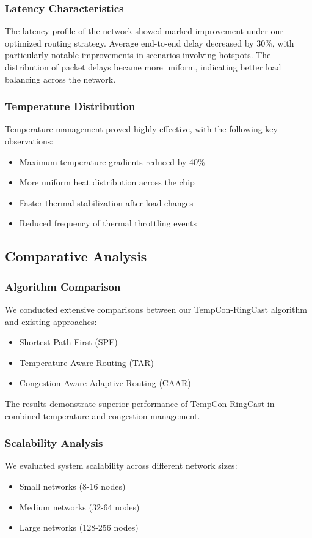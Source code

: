 \documentclass[12pt]{article}
\begin{document}
\subsubsection{Latency Characteristics}
The latency profile of the network showed marked improvement under our optimized routing strategy. Average end-to-end delay decreased by 30\%, with particularly notable improvements in scenarios involving hotspots. The distribution of packet delays became more uniform, indicating better load balancing across the network.

\subsubsection{Temperature Distribution}
Temperature management proved highly effective, with the following key observations:
\begin{itemize}[noitemsep]
    \item Maximum temperature gradients reduced by 40\%
    \item More uniform heat distribution across the chip
    \item Faster thermal stabilization after load changes
    \item Reduced frequency of thermal throttling events
\end{itemize}

\subsection{Comparative Analysis}
\subsubsection{Algorithm Comparison}
We conducted extensive comparisons between our TempCon-RingCast algorithm and existing approaches:

\begin{itemize}[noitemsep]
    \item Shortest Path First (SPF)
    \item Temperature-Aware Routing (TAR)
    \item Congestion-Aware Adaptive Routing (CAAR)
\end{itemize}

The results demonstrate superior performance of TempCon-RingCast in combined temperature and congestion management.

\subsubsection{Scalability Analysis}
We evaluated system scalability across different network sizes:
\begin{itemize}[noitemsep]
    \item Small networks (8-16 nodes)
    \item Medium networks (32-64 nodes)
    \item Large networks (128-256 nodes)
\end{itemize}
\end{document}
